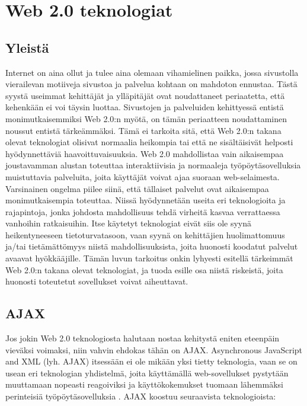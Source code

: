 
\chapter{Web 2.0 teknologiat}

\section{Yleistä}

Internet on aina ollut ja tulee aina olemaan vihamielinen paikka, jossa sivustolla vierailevan motiiveja sivustoa ja palvelua kohtaan on mahdoton ennustaa. Tästä syystä 
useimmat kehittäjät ja ylläpitäjät ovat noudattaneet periaatetta, että kehenkään ei voi täysin luottaa. Sivustojen ja palveluiden kehittyessä entistä monimutkaisemmiksi
Web 2.0:n myötä, on tämän periaatteen noudattaminen noussut entistä tärkeämmäksi. Tämä ei tarkoita sitä, että Web 2.0:n takana olevat teknologiat olisivat normaalia 
heikompia tai että ne sisältäisivät helposti hyödynnettäviä haavoittuvaisuuksia. Web 2.0 mahdollistaa vain aikaisempaa joustavamman alustan toteuttaa interaktiivisia ja
normaaleja työpöytäsovelluksia muistuttavia palveluita, joita käyttäjät voivat ajaa suoraan web-selaimesta. Varsinainen ongelma piilee siinä, että tällaiset palvelut ovat 
aikaisempaa monimutkaisempia toteuttaa. Niissä hyödynnetään useita eri teknologioita ja rajapintoja, jonka johdosta mahdollisuus tehdä virheitä kasvaa verrattaessa
vanhoihin ratkaisuihin. Itse käytetyt teknologiat eivät siis ole syynä heikentyneeseen tietoturvatasoon, vaan syynä on kehittäjien huolimattomuus ja/tai tietämättömyys 
niistä mahdollisuuksista, joita huonosti koodatut palvelut avaavat hyökkääjille. Tämän luvun tarkoitus onkin lyhyesti esitellä tärkeimmät Web 2.0:n takana olevat teknologiat, 
ja tuoda esille osa niistä riskeistä, joita huonosti toteutetut sovellukset voivat aiheuttavat. 

\section {AJAX}

Jos jokin Web 2.0 teknologiosta halutaan nostaa kehitystä eniten eteenpäin vieväksi voimaksi, niin vahvin ehdokas tähän on AJAX.  Asynchronous JavaScript and XML (lyh. AJAX)
itsessään ei ole mikään yksi tietty teknologia, vaan se on usean eri teknologian yhdistelmä, joita käyttämällä web-sovellukset pystytään muuttamaan nopeasti reagoiviksi
ja käyttökokemukset tuomaan lähemmäksi perinteisiä työpöytäsovelluksia \cite{AJAX}. AJAX koostuu seuraavista teknologioista:

